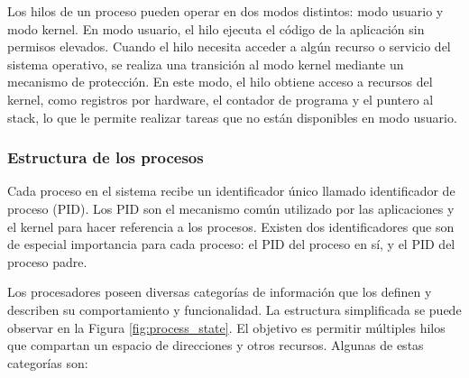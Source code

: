 Los hilos de un proceso pueden operar en dos modos distintos: modo usuario y modo kernel. En modo usuario, el hilo ejecuta el código de la aplicación sin permisos elevados. Cuando el hilo necesita acceder a algún recurso o servicio del sistema operativo, se realiza una transición al modo kernel mediante un mecanismo de protección. En este modo, el hilo obtiene acceso a recursos del kernel, como registros por hardware, el contador de programa y el puntero al stack, lo que le permite realizar tareas que no están disponibles en modo usuario.\par

\subsubsection{Estructura de los procesos}
Cada proceso en el sistema recibe un identificador único llamado identificador de proceso (PID). Los PID son el mecanismo común utilizado por las aplicaciones y el kernel para hacer referencia a los procesos. Existen dos identificadores que son de especial importancia para cada proceso: el PID del proceso en sí, y el PID del proceso padre.\par

Los procesadores poseen diversas categorías de información que los definen y describen su comportamiento y funcionalidad. La estructura simplificada se puede observar en la Figura \ref{fig:process_state}. El objetivo es permitir múltiples hilos que compartan un espacio de direcciones y otros recursos.  Algunas de estas categorías son:\par

